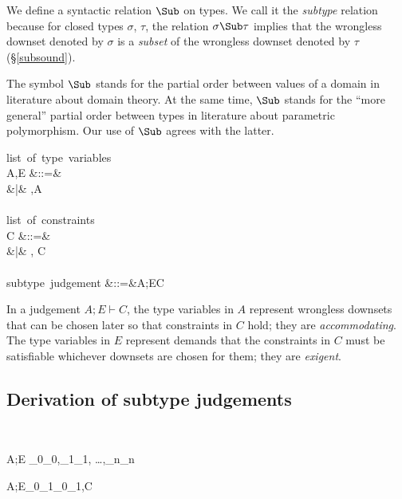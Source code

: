 \documentclass{amsart}
\theoremstyle{definition}
\begin{document}
We define a syntactic relation $\Sub$ on types. We call it the
\emph{subtype} relation because for closed types $\sigma$,
$\tau$, the relation $\sigma \Sub \tau$ implies that the
wrongless downset denoted by $\sigma$ is a \emph{subset} of the
wrongless downset denoted by $\tau$ (\S\ref{subsound}).

The symbol $\Sub$ stands for the partial order between values of
a domain in literature about domain theory. At the same time,
$\Sub$ stands for the ``more general'' partial order between
types in literature about parametric polymorphism. Our use of
$\Sub$ agrees with the latter.

\begin{syntax}
\mbox{list of type variables}\\
A,E
&::=& \emptyset \\
&|& \alpha,A
\\
\\
\mbox{list of constraints}\\
C
&::=& \emptyset \\
&|& \sigma \Sub \tau, C
\\
\\
\mbox{subtype judgement}
&::=&A;E\vdash C
\end{syntax}

In a judgement $A;E\vdash C$, the type variables in $A$ represent
wrongless downsets that can be chosen later so that constraints
in $C$ hold; they are \emph{accommodating}. The type variables in
$E$ represent demands that the constraints in $C$ must be
satisfiable whichever downsets are chosen for them; they are
\emph{exigent}.

\subsection{Derivation of subtype judgements}~

{A;E \vdash \tau_0\Sub\tau_0,\tau_1\Sub\tau_1,
\ldots,\tau_n\Sub\tau_n}

{A;E\vdash\sigma_0\R\sigma_1\Sub\tau_0\R\tau_1,C}

\end{document}
